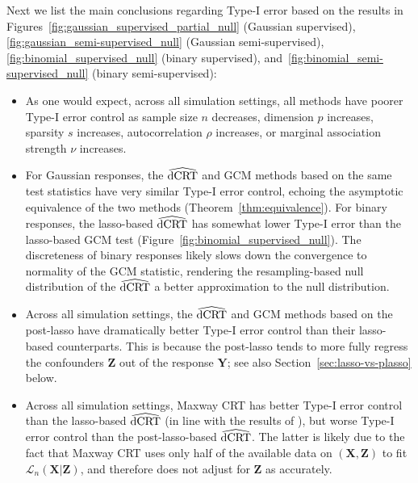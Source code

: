 \documentclass[12pt]{article}
\theoremstyle{definition}
\theoremstyle{remark}
\newcommand{\prx}{\bm X}								%
\newcommand{\prz}{\bm Z}								%
\newcommand{\pry}{{\bm Y}}								%
\newcommand{\law}{\mathcal L}							%
\newcommand{\dCRThat}{\widehat{\textnormal{dCRT}}}		%
\begin{document}
	Next we list the main conclusions regarding Type-I error based on the results in Figures~\ref{fig:gaussian_supervised_partial_null} (Gaussian supervised), \ref{fig:gaussian_semi-supervised_null} (Gaussian semi-supervised), \ref{fig:binomial_supervised_null} (binary supervised), and~\ref{fig:binomial_semi-supervised_null} (binary semi-supervised): 
	\begin{itemize}
		\item As one would expect, across all simulation settings, all methods have poorer Type-I error control as sample size $n$ decreases, dimension $p$ increases, sparsity $s$ increases, autocorrelation $\rho$ increases, or marginal association strength $\nu$ increases.
		\item For Gaussian responses, the $\dCRThat$ and GCM methods based on the same test statistics have very similar Type-I error control, echoing the asymptotic equivalence of the two methods (Theorem~\ref{thm:equivalence}). For binary responses, the lasso-based $\dCRThat$ has somewhat lower Type-I error than the lasso-based GCM test (Figure~\ref{fig:binomial_supervised_null}). The discreteness of binary responses likely slows down the convergence to normality of the GCM statistic, rendering the resampling-based null distribution of the $\dCRThat$ a better approximation to the null distribution.
		\item Across all simulation settings, the $\dCRThat$ and GCM methods based on the post-lasso have dramatically better Type-I error control than their lasso-based counterparts. This is because the post-lasso tends to more fully regress the confounders $\prz$ out of the response $\pry$; see also Section~\ref{sec:lasso-vs-plasso} below.
		\item Across all simulation settings, Maxway CRT has better Type-I error control than the lasso-based $\dCRThat$ (in line with the results of \cite{Li2022}), but worse Type-I error control than the post-lasso-based $\dCRThat$. The latter is likely due to the fact that Maxway CRT uses only half of the available data on $(\prx, \prz)$ to fit $\law_n(\prx|\prz)$, and therefore does not adjust for $\prz$ as accurately.
	\end{itemize}
	
\end{document}
